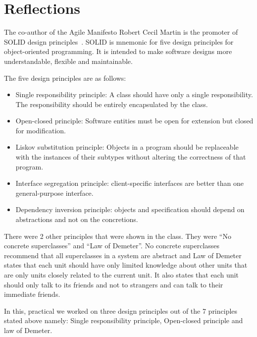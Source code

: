 \section{Reflections}

The co-author of the Agile Manifesto Robert Cecil Martin is the promoter of SOLID design principles~\cite{martin2002agile}. SOLID is mnemonic for five design principles for object-oriented programming. It is intended to make software designs more understandable, flexible and maintainable.

The five design principles are as follows:

\begin{itemize}
    \item Single responsibility principle: A class should have only a single responsibility. The responsibility should be entirely encapsulated by the class.
    \item Open-closed principle: Software entities must be open for extension but closed for modification.
    \item Liskov substitution principle: Objects in a program should be replaceable with the instances of their subtypes without altering the correctness of that program.
    \item Interface segregation principle: client-specific interfaces are better than one general-purpose interface.
    \item Dependency inversion principle: objects and specification should depend on abstractions and not on the concretions.
\end{itemize}

There were 2 other principles that were shown in the class. They were ``No concrete superclasses'' and ``Law of Demeter''. No concrete superclasses recommend that all superclasses in a system are abstract and Law of Demeter states that each unit should have only limited knowledge about other units that are only units closely related to the current unit. It also states that each unit should only talk to its friends and not to strangers and can talk to their immediate friends.

In this, practical we worked on three design principles out of the 7 principles stated above namely: Single responsibility principle, Open-closed principle and law of Demeter.


